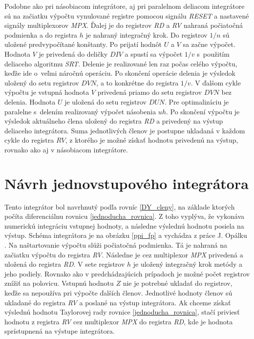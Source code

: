 Podobne ako pri násobiacom integrátore, aj pri paralelnom deliacom integrátore sú na začiatku výpočtu vynulované registre pomocou signálu \textit{RESET} a nastavené signály multiplexorov \textit{MPX}. Ďalej je do registrov \textit{RD} a \textit{RV} nahraná počiatočná podmienka a do registra $ h $ je nahraný integračný krok. Do registrov $ 1/n $ sú uložené predvypočítané konštanty. Po prijatí hodnôt $ U $ a $ V $ sa začne výpočet. Hodnota $ V $ je privedená do deličky $ DIV $ a spustí sa výpočet $ 1/v $ s~použitím deliaceho algoritmu \textit{SRT}. Delenie je realizované len raz počas celého výpočtu, keďže ide o~veľmi náročnú operáciu. Po skončení operácie delenia je výsledok uložený do setu registrov $ DVN $, a to konkrétne do registra $ 1/v $. V ďalšom cykle výpočtu je vstupná hodnota $ V $ privedená priamo do setu registrov $ DVN $ bez delenia. Hodnota $ U $ je uložená do setu registrov $ DUN $. Pre optimalizáciu je paralelne s~delením realizovaný výpočet násobenia $ uh $. Po skončení výpočtu je výsledok aktuálneho člena uložený do registra \textit{RD} a privedený na výstup deliaceho integrátora. Suma jednotlivých členov je postupne ukladaná v každom cykle do registra $ RV $, z ktorého je možné získať hodnotu privedenú na výstup, rovnako ako aj v násobiacom integrátore.


\section{Návrh jednovstupového integrátora}
Tento integrátor bol navrhnutý podľa rovníc \eqref{DY_cleny}, na základe ktorých počíta diferenciálnu rovnicu \eqref{jednoducha_rovnica}. Z toho vyplýva, že vykonáva numerickú integráciu vstupnej hodnoty, a následne výslednú hodnotu posiela na výstup. Schéma integrátora je na obrázku \ref{ppi_fp} a vychádza z práce J. Opálku \cite{OpalkaBP}. Na naštartovanie výpočtu slúži počiatočná podmienka. Tá je nahraná na začiatku výpočtu do registra \textit{RV}. Následne je cez multiplexor \textit{MPX} privedená a uložená do registra \textit{RD}. V sete registrov $ h $ je uložený integračný krok metódy a jeho podiely. Rovnako ako v predchádzajúcich prípadoch je možné počet registrov znížiť na polovicu. Vstupnú hodnotu $ Z $ nie je potrebné ukladať do registrov, keďže sa nepoužíva pri výpočte ďalších členov. Jednotlivé hodnoty členov sú ukladané do registra \textit{RV} a poslané na výstup integrátora. Ak chceme získať výslednú hodnotu Taylorovej rady rovnice \eqref{jednoducha_rovnica}, stačí priviesť hodnotu z registra \textit{RV} cez multiplexor \textit{MPX} do registra \textit{RD}, kde je hodnota sprístupnená na výstupe integrátora.


